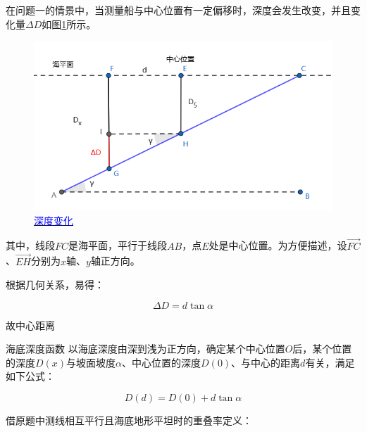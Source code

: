 
在问题一的情景中，当测量船与中心位置有一定偏移时，深度会发生改变，并且变化量$\Delta D$如图\ref{fig:深度变化}所示。



\begin{figure}[h]
    \centering
    \includegraphics[scale=0.5]{res/img/深度变化.png}
    \caption{\href{https://www.geogebra.org/m/ytasr4g4}{\textcolor{blue}{深度变化}}}
    \label{fig:深度变化}
\end{figure}

其中，线段$FC$是海平面，平行于线段$AB$，点$E$处是中心位置。为方便描述，设$\overrightarrow{FC}$、$\overrightarrow{EH}$分别为$x$轴、$y$轴正方向。

根据几何关系，易得：

\begin{equation}
    \Delta D = d\tan\alpha
\end{equation}

故中心距离\newline\newline\newline\newline

\begin{mcmTheorem}{海底深度函数}
    以海底深度由深到浅为正方向，确定某个中心位置$O$后，某个位置的深度$D(x)$与坡面坡度$\alpha$、中心位置的深度$D(0)$、与中心的距离$d$有关，满足如下公式：

    \begin{equation}
        D(d) = D(0) + d\tan\alpha
    \end{equation}
\end{mcmTheorem}


借原题中测线相互平行且海底地形平坦时的重叠率定义：

